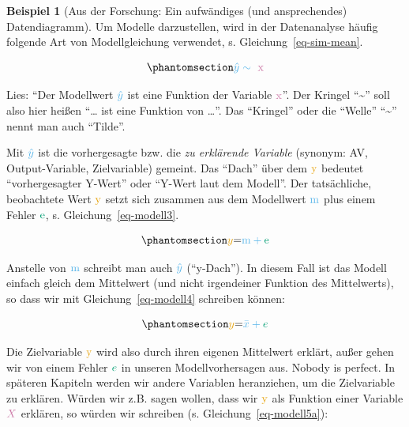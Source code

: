 \documentclass[
  a4paper,
]{scrbook}
\theoremstyle{definition}
\newtheorem{example}{Beispiel}[chapter]
\theoremstyle{definition}
\theoremstyle{definition}
\theoremstyle{remark}
\begin{document}
\begin{example}[Aus der Forschung: Ein aufwändiges (und ansprechendes)
Datendiagramm]
Um Modelle darzustellen, wird in der Datenanalyse häufig folgende Art
von Modellgleichung verwendet, s. Gleichung~\ref{eq-sim-mean}.

\begin{equation}\phantomsection\label{eq-sim-mean}{\color{modelcol}{\hat{y}} \sim \color{xcol}{\text{ x}}}\end{equation}

Lies: ``Der Modellwert \(\color{modelcol}{\hat{y}}\) ist eine Funktion
der Variable \(\color{xcol}{\text{x}}\)''. Der Kringel
``\textasciitilde{}'' soll also hier heißen ``\ldots{} ist eine Funktion
von \ldots{}''. Das ``Kringel'' oder die ``Welle'' ``\textasciitilde{}''
nennt man auch ``Tilde''.

Mit \(\color{modelcol}{\hat{y}}\) ist die vorhergesagte bzw. die
\emph{zu erklärende Variable} (synonym: AV, Output-Variable,
Zielvariable) gemeint. Das ``Dach'' über dem \(\color{ycol}{\text{y}}\)
bedeutet ``vorhergesagter Y-Wert'' oder ``Y-Wert laut dem Modell''. Der
tatsächliche, beobachtete Wert \(\color{ycol}{\text{y}}\) setzt sich
zusammen aus dem Modellwert \(\color{modelcol}{\text{m}}\) plus einem
Fehler \(\color{errorcol}{\text{e}}\), s. Gleichung~\ref{eq-modell3}.

\begin{equation}\phantomsection\label{eq-modell3}{\color{ycol}{y} \color{black}{ = } \color{modelcol}{\text{m}} + \color{errorcol}{\text{e}}}\end{equation}

Anstelle von \(\color{modelcol}{\text{m}}\) schreibt man auch
\(\color{modelcol}{\hat{y}}\) (``y-Dach''). In diesem Fall ist das
Modell einfach gleich dem Mittelwert (und nicht irgendeiner Funktion des
Mittelwerts), so dass wir mit Gleichung~\ref{eq-modell4} schreiben
können:

\begin{equation}\phantomsection\label{eq-modell4}{\color{ycol}{y}  \color{black}{ = } \color{modelcol}{\bar{x}} + \color{errorcol}{e}}\end{equation}

Die Zielvariable \(\color{ycol}{\text{y}}\) wird also durch ihren
eigenen Mittelwert erklärt, außer gehen wir von einem Fehler
\(\color{errorcol}e\) in unseren Modellvorhersagen aus. Nobody is
perfect. In späteren Kapiteln werden wir andere Variablen heranziehen,
um die Zielvariable zu erklären. Würden wir z.B. sagen wollen, dass wir
\(\color{ycol}{\text{y}}\) als Funktion einer Variable
\(\color{xcol}{X}\) erklären, so würden wir schreiben (s.
Gleichung~\ref{eq-modell5a}):


\end{example}
\end{document}
